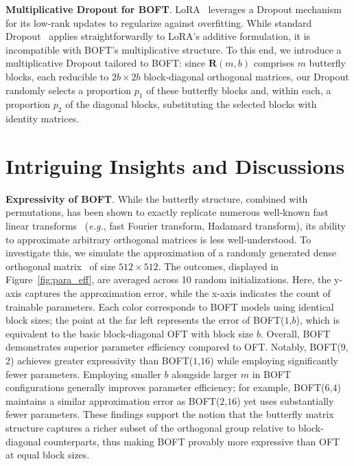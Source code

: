 \textbf{Multiplicative Dropout for BOFT}. LoRA~\cite{hulora2022} leverages a Dropout mechanism for its low-rank updates to regularize against overfitting. While standard Dropout~\cite{srivastava2014dropout} applies straightforwardly to LoRA’s additive formulation, it is incompatible with BOFT’s multiplicative structure. To this end, we introduce a multiplicative Dropout tailored to BOFT: since $\bm{R}(m,b)$ comprises $m$ butterfly blocks, each reducible to $2b\times 2b$ block-diagonal orthogonal matrices, our Dropout randomly selects a proportion $p_1$ of these butterfly blocks and, within each, a proportion $p_2$ of the diagonal blocks, substituting the selected blocks with identity matrices.

\section{Intriguing Insights and Discussions}

\textbf{Expressivity of BOFT}. While the butterfly structure, combined with permutations, has been shown to exactly replicate numerous well-known fast linear transforms~\cite{dao2019learning,dao2019kaleidoscope} (\emph{e.g.}, fast Fourier transform, Hadamard transform), its ability to approximate arbitrary orthogonal matrices is less well-understood. To investigate this, we simulate the approximation of a randomly generated dense orthogonal matrix~\cite{anderson1987generation} of size $512\times 512$. The outcomes, displayed in Figure~\ref{fig:para_eff}, are averaged across 10 random initializations. Here, the y-axis captures the approximation error, while the x-axis indicates the count of trainable parameters. Each color corresponds to BOFT models using identical block sizes; the point at the far left represents the error of BOFT($1$,$b$), which is equivalent to the basic block-diagonal OFT with block size $b$. Overall, BOFT demonstrates superior parameter efficiency compared to OFT. Notably, BOFT($9$,$2$) achieves greater expressivity than BOFT($1$,$16$) while employing significantly fewer parameters. Employing smaller $b$ alongside larger $m$ in BOFT configurations generally improves parameter efficiency; for example, BOFT($6$,$4$) maintains a similar approximation error as BOFT($2$,$16$) yet uses substantially fewer parameters. These findings support the notion that the butterfly matrix structure captures a richer subset of the orthogonal group relative to block-diagonal counterparts, thus making BOFT provably more expressive than OFT at equal block sizes.

